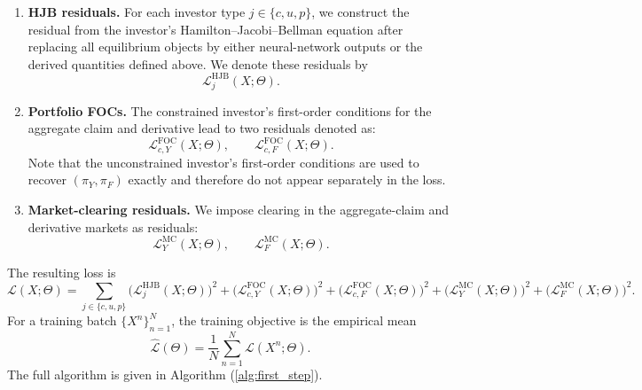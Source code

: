 \begin{enumerate}
    \item \textbf{HJB residuals.} For each investor type $j\in\{c,u,p\}$, we construct the residual from the investor's Hamilton--Jacobi--Bellman equation after replacing all equilibrium objects by either neural-network outputs or the derived quantities defined above.
    We denote these residuals by
    \[
    \mathcal L^{\mathrm{HJB}}_j(X;\Theta).
    \]

    \item \textbf{Portfolio FOCs.} The constrained investor's first-order conditions for the aggregate claim and derivative lead to two residuals denoted as:
    \[
    \mathcal L^{\mathrm{FOC}}_{c,Y}(X;\Theta),
    \qquad
    \mathcal L^{\mathrm{FOC}}_{c,F}(X;\Theta).
    \]
    Note that the unconstrained investor's first-order conditions are used to recover $(\pi_Y,\pi_F)$ exactly and therefore do not appear separately in the loss.

    \item \textbf{Market-clearing residuals.} We impose clearing in the aggregate-claim and derivative markets as residuals:
    \[
    \mathcal L^{\mathrm{MC}}_Y(X;\Theta),
    \qquad
    \mathcal L^{\mathrm{MC}}_F(X;\Theta).
    \]
\end{enumerate}
The resulting loss is
\begin{equation}
    \label{eq:baseline_pointwise_loss_appendix}
    \mathcal L(X;\Theta)
    =
    \sum_{j\in\{c,u,p\}}\bigl(\mathcal L^{\mathrm{HJB}}_j(X;\Theta)\bigr)^2
    +\bigl(\mathcal L^{\mathrm{FOC}}_{c,Y}(X;\Theta)\bigr)^2
    +\bigl(\mathcal L^{\mathrm{FOC}}_{c,F}(X;\Theta)\bigr)^2
    +\bigl(\mathcal L^{\mathrm{MC}}_{Y}(X;\Theta)\bigr)^2
    +\bigl(\mathcal L^{\mathrm{MC}}_{F}(X;\Theta)\bigr)^2.
\end{equation}
For a training batch $\{X^n\}_{n=1}^N$, the training objective is the empirical mean
\begin{equation}
\label{eq:baseline_batch_loss_appendix}
\widehat{\mathcal L}(\Theta)
=\frac{1}{N}\sum_{n=1}^N \mathcal L(X^n;\Theta).
\end{equation}
The full algorithm is given in Algorithm (\ref{alg:first_step}).



